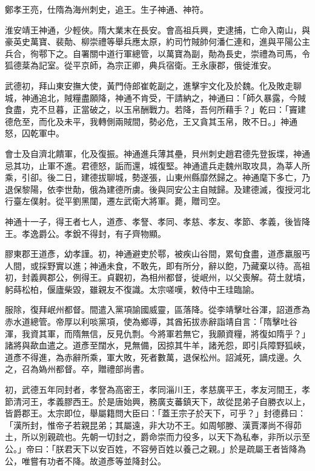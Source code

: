 \begin{pinyinscope}
 鄭孝王亮，仕隋為海州刺史，追王。生子神通、神符。



 淮安靖王神通，少輕俠。隋大業末在長安。會高祖兵興，吏逮捕，亡命入南山，與豪英史萬寶、裴勣、柳崇禮等舉兵應太原，約司竹賊帥何潘仁連和，進與平陽公主兵合，徇鄠下之。自署關中道行軍總管，以萬寶為副，勣為長史，崇禮為司馬，令狐德棻為記室。從平京師，為宗正卿，典兵宿衛。王永康郡，俄徙淮安。



 武德初，拜山東安撫大使，黃門侍郎崔乾副之，進擊宇文化及於魏。化及敗走聊城，神通追北，賊糧盡願降，神通不肯受，干請納之，神通曰：「師久暴露，今賊食盡，克不旦暮，正當破之，以玉帛酬戰力。若降，吾何所藉手？」乾曰：「竇建德危至，而化及未平，我轉側兩賊間，勢必危，王又貪其玉帛，敗不日。」神通怒，囚乾軍中。



 會士及自濟北饋軍，化及復振。神通進兵薄其壘，貝州刺史趙君德先登扳堞，神通忌其功，止軍不進。君德怒，詬而還，城復堅。神通遣兵走魏州取攻具，為莘人所乘，引卻。後二日，建德拔聊城，勢遂張，山東州縣靡然歸之。神通麾下多亡，乃退保黎陽，依李世勣，俄為建德所虜。後與同安公主自賊歸。及建德滅，復授河北行臺左僕射。從平劉黑闥，遷左武衛大將軍。薨，贈司空。



 神通十一子，得王者七人，道彥、孝詧、孝同、孝慈、孝友、孝節、孝義，後皆降王。孝逸爵公。孝銳不得封，有子齊物顯。



 膠東郡王道彥，幼孝謹。初，神通避吏於鄠，被疾山谷間，累旬食盡，道彥羸服丐人間，或採野實以進；神通未食，不敢先，即有所分，辭以飽，乃藏棄以待。高祖初，封義興郡公，例得王。貞觀初，為相州都督，徙岷州，以父喪解。荷土就墳，躬蒔松柏，偃廬柴毀，雖親友不復識。太宗嗟嘆，敕侍中王珪臨諭。



 服除，復拜岷州都督。間遣入黨項諭國威靈，區落降。從李靖擊吐谷渾，詔道彥為赤水道總管。帝厚以利啖黨項，使為鄉導，其酋拓拔赤辭詣靖自言：「隋擊吐谷渾，我資其軍，而隋無信，反見仇剽。今將軍若無它，我願資糧，將復如隋乎？」諸將與歃血遣之。道彥至闊水，見無備，因掠其牛羊，諸羌怨，即引兵障野狐峽，道彥不得進，為赤辭所乘，軍大敗，死者數萬，退保松州。詔減死，謫戍邊。久之，召為媯州都督。卒，贈禮部尚書。



 初，武德五年同封者，孝詧為高密王，孝同淄川王，孝慈廣平王，孝友河間王，孝節清河王，孝義膠西王。於是唐始興，務廣支蕃鎮天下，故從昆弟子自勝衣以上，皆爵郡王。太宗即位，舉屬籍問大臣曰：「蓋王宗子於天下，可乎？」封德彞曰：「漢所封，惟帝子若親昆弟；其屬遠，非大功不王。如周郇滕、漢賈澤尚不得茆土，所以別親疏也。先朝一切封之，爵命崇而力役多，以天下為私奉，非所以示至公。」帝曰：「朕君天下以安百姓，不容勞百姓以養己之親。」於是疏屬王者皆降為公，唯嘗有功者不降。故道彥等並降封公。




\end{pinyinscope}
